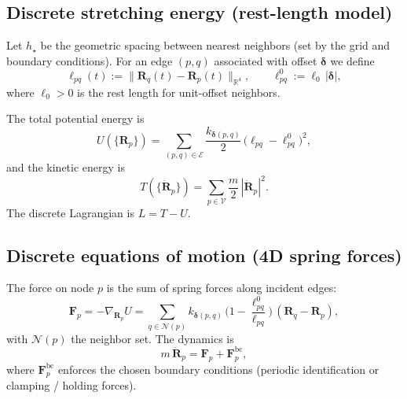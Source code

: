 \documentclass[11pt,a4paper]{article}
\begin{document}
\subsection{Discrete stretching energy (rest-length model)}
Let $h_\star$ be the geometric spacing between nearest neighbors (set by the grid
and boundary conditions). For an edge $(p,q)$ associated with offset
$\boldsymbol{\delta}$ we define
\[
  \ell_{pq}(t) := \|\mathbf{R}_q(t)-\mathbf{R}_p(t)\|_{\mathbb{R}^4},
  \qquad
  \ell^0_{pq} := \ell_0\,|\boldsymbol{\delta}|,
\]
where $\ell_0>0$ is the rest length for unit-offset neighbors.

The total potential energy is
\begin{equation}
  U(\{\mathbf{R}_p\})
  = \sum_{(p,q)\in\mathcal{E}} \frac{k_{\boldsymbol{\delta}(p,q)}}{2}\,
    \big(\ell_{pq}-\ell^0_{pq}\big)^2,
  \label{eq:discrete_energy}
\end{equation}
and the kinetic energy is
\begin{equation}
  T(\{\dot{\mathbf{R}}_p\})
  = \sum_{p\in\mathcal{V}} \frac{m}{2}\,|\dot{\mathbf{R}}_p|^2.
  \label{eq:discrete_kinetic}
\end{equation}
The discrete Lagrangian is $L=T-U$.

\subsection{Discrete equations of motion (4D spring forces)}
The force on node $p$ is the sum of spring forces along incident edges:
\begin{equation}
  \mathbf{F}_p
  = -\nabla_{\mathbf{R}_p}U
  = \sum_{q\in\mathcal{N}(p)}
    k_{\boldsymbol{\delta}(p,q)}\,
    \Big(1-\frac{\ell^0_{pq}}{\ell_{pq}}\Big)\,(\mathbf{R}_q-\mathbf{R}_p),
  \label{eq:discrete_force}
\end{equation}
with $\mathcal{N}(p)$ the neighbor set. The dynamics is
\begin{equation}
  m\,\ddot{\mathbf{R}}_p = \mathbf{F}_p + \mathbf{F}^{\mathrm{bc}}_p,
  \label{eq:discrete_eom}
\end{equation}
where $\mathbf{F}^{\mathrm{bc}}_p$ enforces the chosen boundary conditions
(periodic identification or clamping / holding forces).
\end{document}
